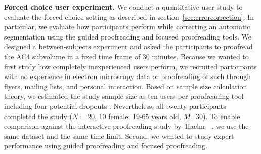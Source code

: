 \textbf{Forced choice user experiment.} We conduct a quantitative user study to evaluate the forced choice setting as described in section~\ref{sec:errorcorrection}. In particular, we evaluate how participants perform while correcting an automatic segmentation using the guided proofreading and focused proofreading tools. We designed a between-subjects experiment and asked the participants to proofread the AC4 subvolume in a fixed time frame of 30 minutes. 
Because we wanted to first study how completely inexperienced users perform, we recruited participants with no experience in electron microscopy data or proofreading of such through flyers, mailing lists, and personal interaction. Based on sample size calculation theory, we estimated the study sample size as ten users per proofreading tool including four potential dropouts \cite{samplesize1, samplesize2}. Nevertheless, all twenty participants completed the study ($N=20$, 10 female; 19-65 years old, $M$=30). To enable comparison against the interactive proofreading study by~Haehn~\etal~, we use the same dataset and the same time limit. 
Second, we wanted to study expert performance using guided proofreading and focused proofreading.







